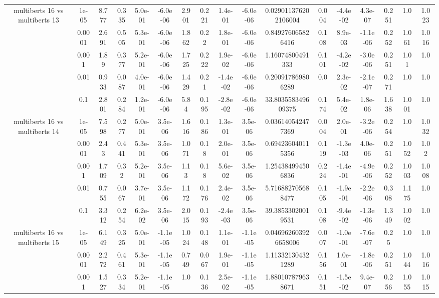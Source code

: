 \begin{tabular}{|c|c|c|c|c|c|c|c|c|c|c|c|c|c|c|c|c|}
\hline
\multirow{5}{*}{multiberts 16 vs multiberts 13} & 1e-05 & 8.777 & 0.335 & 5.0e-01 & -6.0e-06 & 2.901 & 0.221 & 1.4e-01 & -6.0e-06 & 0.029011376202106004 & 0.004 & -4.4e-02 & 4.3e-07 & 0.251 & 1.0 & 1.023 \\
 & 0.0001 & 2.691 & 0.505 & 5.3e-01 & -6.0e-06 & 1.862 & 0.22 & 1.8e-01 & -6.0e-06 & 0.849276065826416 & 0.108 & 8.9e-03 & -1.1e-06 & 0.252 & 1.061 & 1.016 \\
 & 0.001 & 1.89 & 0.377 & 5.2e-01 & -6.0e-06 & 1.725 & 0.222 & 1.9e-02 & -6.0e-06 & 1.16074800491333 & 0.101 & -4.2e-02 & -3.0e-06 & 0.251 & 1.01 & 1.0 \\
 & 0.01 & 0.933 & 0.087 & 4.0e-01 & -6.0e-06 & 1.429 & 0.21 & -1.4e-02 & -6.0e-06 & 0.200917869806289 & 0.0 & 2.3e-02 & -2.1e-07 & 0.271 & 1.0 & 1.0 \\
 & 0.1 & 2.801 & 0.284 & 1.2e-01 & -6.0e-06 & 5.84 & 0.195 & -2.8e-02 & -6.0e-06 & 33.803558349609375 & 0.174 & 5.4e-02 & 1.8e-06 & 1.638 & 1.001 & 1.0 \\
\hline
\multirow{5}{*}{multiberts 16 vs multiberts 14} & 1e-05 & 7.598 & 0.277 & 5.0e-01 & 3.5e-06 & 1.616 & 0.186 & 1.3e-01 & 3.5e-06 & 0.036140542477369 & 0.004 & 2.0e-01 & -3.2e-06 & 0.254 & 1.0 & 1.032 \\
 & 0.0001 & 2.43 & 0.441 & 5.3e-01 & 3.5e-06 & 1.071 & 0.18 & 2.0e-01 & 3.5e-06 & 0.694236040115356 & 0.119 & -1.3e-03 & 4.0e-06 & 0.251 & 1.052 & 1.02 \\
 & 0.001 & 1.709 & 0.32 & 5.2e-01 & 3.5e-06 & 1.13 & 0.18 & 5.6e-02 & 3.5e-06 & 1.254384994506836 & 0.224 & -1.4e-01 & -4.9e-06 & 0.252 & 1.003 & 1.008 \\
 & 0.01 & 0.755 & 0.067 & 3.7e-01 & 3.5e-06 & 1.172 & 0.176 & 2.4e-02 & 3.5e-06 & 5.716882705688477 & 0.105 & -1.9e-01 & -2.2e-06 & 0.308 & 1.175 & 1.0 \\
 & 0.1 & 3.312 & 0.254 & 6.2e-02 & 3.5e-06 & 2.015 & 0.193 & -2.4e-03 & 3.5e-06 & 39.38533020019531 & 0.108 & -9.4e-02 & -1.3e-06 & 1.349 & 1.002 & 1.0 \\
\hline
\multirow{5}{*}{multiberts 16 vs multiberts 15} & 1e-05 & 6.149 & 0.325 & 5.0e-01 & -1.1e-05 & 1.024 & 0.148 & 1.1e-01 & -1.1e-05 & 0.046962603926658006 & 0.007 & -1.0e-01 & -7.6e-07 & 0.25 & 1.0 & 1.0 \\
 & 0.0001 & 2.272 & 0.461 & 5.3e-01 & -1.1e-05 & 0.749 & 0.067 & 1.9e-01 & -1.1e-05 & 1.113321304321289 & 0.156 & 1.0e-01 & -1.8e-06 & 0.251 & 1.044 & 1.016 \\
 & 0.001 & 1.527 & 0.334 & 5.2e-01 & -1.1e-05 & 1.0 & 0.136 & 2.5e-02 & -1.1e-05 & 1.880107879638671 & 0.151 & -1.5e-02 & 9.4e-07 & 0.256 & 1.055 & 1.015 \\

\end{tabular}
